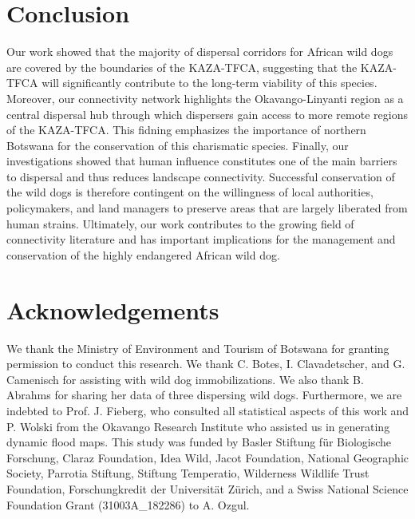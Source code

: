 \documentclass[abstract=on,10pt,a4paper,bibliography=totocnumbered]{article}
\begin{document}
\section{Conclusion}
Our work showed that the majority of dispersal corridors for African wild dogs
are covered by the boundaries of the KAZA-TFCA, suggesting that the KAZA-TFCA
will significantly contribute to the long-term viability of this species.
Moreover, our connectivity network highlights the Okavango-Linyanti region as a
central dispersal hub through which dispersers gain access to more remote
regions of the KAZA-TFCA. This fidning emphasizes the importance of northern
Botswana for the conservation of this charismatic species. Finally, our
investigations showed that human influence constitutes one of the main barriers
to dispersal and thus reduces landscape connectivity. Successful conservation of
the wild dogs is therefore contingent on the willingness of local authorities,
policymakers, and land managers to preserve areas that are largely liberated
from human strains. Ultimately, our work contributes to the growing field of
connectivity literature and has important implications for the management and
conservation of the highly endangered African wild dog.

\section{Acknowledgements}
We thank the Ministry of Environment and Tourism of Botswana for granting
permission to conduct this research. We thank C. Botes, I. Clavadetscher, and G.
Camenisch for assisting with wild dog immobilizations. We also thank B. Abrahms
for sharing her data of three dispersing wild dogs. Furthermore, we are indebted
to Prof. J. Fieberg, who consulted all statistical aspects of this work and P.
Wolski from the Okavango Research Institute who assisted us in generating
dynamic flood maps. This study was funded by Basler Stiftung für Biologische
Forschung, Claraz Foundation, Idea Wild, Jacot Foundation, National Geographic
Society, Parrotia Stiftung, Stiftung Temperatio, Wilderness Wildlife Trust
Foundation, Forschungkredit der Universität Zürich, and a Swiss National Science
Foundation Grant (31003A\_182286) to A. Ozgul.

\newpage
\begingroup
\singlespacing

\endgroup
\end{document}

